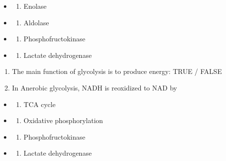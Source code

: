 \documentclass[
]{book}
\providecommand{\tightlist}{%
  \setlength{\itemsep}{0pt}\setlength{\parskip}{0pt}}
\begin{document}
\begin{itemize}
\tightlist
\item
  \begin{enumerate}
  \def\labelenumi{(\Alph{enumi})}
  \tightlist
  \item
    Enolase\\
  \end{enumerate}
\item
  \begin{enumerate}
  \def\labelenumi{(\Alph{enumi})}
  \setcounter{enumi}{1}
  \tightlist
  \item
    Aldolase\\
  \end{enumerate}
\item
  \begin{enumerate}
  \def\labelenumi{(\Alph{enumi})}
  \setcounter{enumi}{2}
  \tightlist
  \item
    Phosphofructokinase\\
  \end{enumerate}
\item
  \begin{enumerate}
  \def\labelenumi{(\Alph{enumi})}
  \setcounter{enumi}{3}
  \tightlist
  \item
    Lactate dehydrogenase
  \end{enumerate}
\end{itemize}

\begin{enumerate}
\def\labelenumi{\arabic{enumi}.}
\setcounter{enumi}{1}
\item
  The main function of glycolysis is to produce energy: TRUE / FALSE
\item
  In Anerobic glycolysis, NADH is reoxidized to NAD by
\end{enumerate}

\begin{itemize}
\tightlist
\item
  \begin{enumerate}
  \def\labelenumi{(\Alph{enumi})}
  \tightlist
  \item
    TCA cycle\\
  \end{enumerate}
\item
  \begin{enumerate}
  \def\labelenumi{(\Alph{enumi})}
  \setcounter{enumi}{1}
  \tightlist
  \item
    Oxidative phosphorylation\\
  \end{enumerate}
\item
  \begin{enumerate}
  \def\labelenumi{(\Alph{enumi})}
  \setcounter{enumi}{2}
  \tightlist
  \item
    Phosphofructokinase\\
  \end{enumerate}
\item
  \begin{enumerate}
  \def\labelenumi{(\Alph{enumi})}
  \setcounter{enumi}{3}
  \tightlist
  \item
    Lactate dehydrogenase
  \end{enumerate}
\end{itemize}
\end{document}
